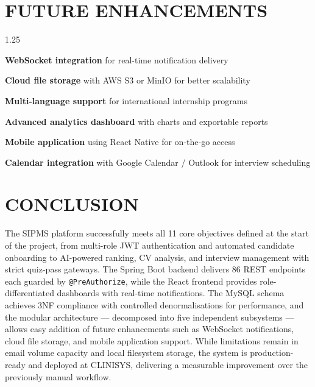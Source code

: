 \section{FUTURE ENHANCEMENTS}
\begin{itemize}[leftmargin=2cm, topsep=4pt]
    \begin{spacing}{1.25}
        \item \textbf{WebSocket integration} for real-time notification delivery
        \item \textbf{Cloud file storage} with AWS S3 or MinIO for better scalability
        \item \textbf{Multi-language support} for international internship programs
        \item \textbf{Advanced analytics dashboard} with charts and exportable reports
        \item \textbf{Mobile application} using React Native for on-the-go access
        \item \textbf{Calendar integration} with Google Calendar / Outlook for interview scheduling
    \end{spacing}
\end{itemize}

\section{CONCLUSION}
The SIPMS platform successfully meets all 11 core objectives defined at the start of the project, from multi-role JWT authentication and automated candidate onboarding to AI-powered ranking, CV analysis, and interview management with strict quiz-pass gateways. The Spring Boot backend delivers 86 REST endpoints each guarded by \texttt{@PreAuthorize}, while the React frontend provides role-differentiated dashboards with real-time notifications. The MySQL schema achieves 3NF compliance with controlled denormalisations for performance, and the modular architecture — decomposed into five independent subsystems — allows easy addition of future enhancements such as WebSocket notifications, cloud file storage, and mobile application support. While limitations remain in email volume capacity and local filesystem storage, the system is production-ready and deployed at CLINISYS, delivering a measurable improvement over the previously manual workflow.
